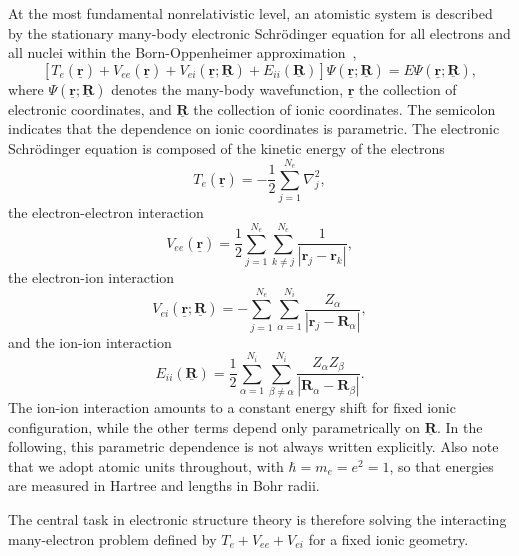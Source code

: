 \documentclass[preprint,12pt,compress,numafflabel]{elsarticle}
\begin{document}
At the most fundamental nonrelativistic level, an atomistic system is described by the stationary many-body electronic Schr\"odinger equation for all electrons and all nuclei within the Born-Oppenheimer approximation~\cite{born_zur_1927},
\begin{equation}
\left[ T_e(\underline{\bm{r}}) + V_{ee}(\underline{\bm{r}}) + V_{ei}(\underline{\bm{r}};\underline{\bm{R}}) + E_{ii}(\underline{\bm{R}}) \right] \Psi(\underline{\bm{r}};\underline{\bm{R}})
=
E \Psi(\underline{\bm{r}};\underline{\bm{R}}),
\end{equation}
where $\Psi(\underline{\bm{r}};\underline{\bm{R}})$ denotes the many-body wavefunction, $\underline{\bm{r}}$ the collection of electronic coordinates, and $\underline{\bm{R}}$ the collection of ionic coordinates. The semicolon indicates that the dependence on ionic coordinates is parametric.
The electronic Schrödinger equation is composed of the kinetic energy of the electrons
\begin{equation}
T_e(\underline{\bm{r}}) = -\frac{1}{2}\sum_{j=1}^{N_e} \nabla_j^2,
\end{equation}
the electron-electron interaction
\begin{equation}
V_{ee}(\underline{\bm{r}}) =
\frac{1}{2}\sum_{j=1}^{N_e}\sum_{k \ne j}^{N_e}\frac{1}{|\bm{r}_j-\bm{r}_k|},
\end{equation}
the electron-ion interaction
\begin{equation}
V_{ei}(\underline{\bm{r}};\underline{\bm{R}}) =
-\sum_{j=1}^{N_e}\sum_{\alpha=1}^{N_i}\frac{Z_{\alpha}}{|\bm{r}_j-\bm{R}_{\alpha}|},
\end{equation}
and the ion-ion interaction
\begin{equation}
E_{ii}(\underline{\bm{R}}) =
\frac{1}{2}\sum_{\alpha=1}^{N_i}\sum_{\beta \ne \alpha}^{N_i}
\frac{Z_{\alpha} Z_{\beta}}{|\bm{R}_{\alpha}-\bm{R}_{\beta}|}.
\end{equation}
The ion-ion interaction amounts to a constant energy shift for fixed ionic configuration, while the other terms depend only parametrically on $\underline{\bm{R}}$. In the following, this parametric dependence is not always written explicitly. Also note that we adopt atomic units throughout, with $\hbar = m_e = e^2 = 1$, so that energies are measured in Hartree and lengths in Bohr radii.

The central task in electronic structure theory is therefore solving the interacting many-electron problem defined by $T_e + V_{ee} + V_{ei}$ for a fixed ionic geometry.
\end{document}
